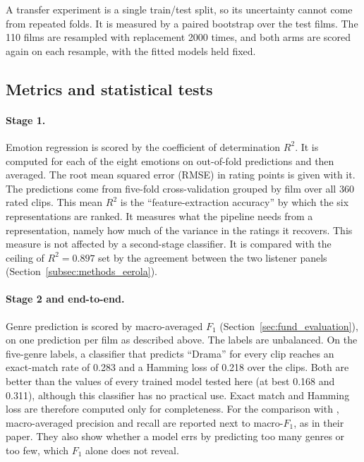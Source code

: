 A transfer experiment is a single train/test split, so its uncertainty cannot come from repeated folds. It is measured by a paired bootstrap over the test films. The 110 films are resampled with replacement 2000 times, and both arms are scored again on each resample, with the fitted models held fixed.

\subsection{Metrics and statistical tests}
\label{subsec:protocol_metrics}

\paragraph{Stage 1.} Emotion regression is scored by the coefficient of determination $R^2$. It is computed for each of the eight emotions on out-of-fold predictions and then averaged. The root mean squared error (RMSE) in rating points is given with it. The predictions come from five-fold cross-validation grouped by film over all 360 rated clips. This mean $R^2$ is the ``feature-extraction accuracy'' by which the six representations are ranked. It measures what the pipeline needs from a representation, namely how much of the variance in the ratings it recovers. This measure is not affected by a second-stage classifier. It is compared with the ceiling of $R^2=0.897$ set by the agreement between the two listener panels (Section~\ref{subsec:methods_eerola}).

\paragraph{Stage 2 and end-to-end.} Genre prediction is scored by macro-averaged $F_1$ (Section~\ref{sec:fund_evaluation}), on one prediction per film as described above. The labels are unbalanced. On the five-genre labels, a classifier that predicts ``Drama'' for every clip reaches an exact-match rate of 0.283 and a Hamming loss of 0.218 over the clips. Both are better than the values of every trained model tested here (at best 0.168 and 0.311), although this classifier has no practical use. Exact match and Hamming loss are therefore computed only for completeness. For the comparison with \citet{ma2021computational}, macro-averaged precision and recall are reported next to macro-$F_1$, as in their paper. They also show whether a model errs by predicting too many genres or too few, which $F_1$ alone does not reveal.

